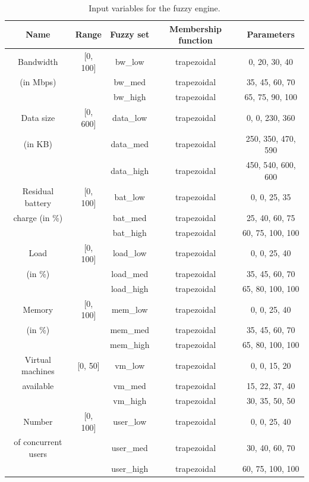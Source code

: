 \begin{table}[H]
	\centering
	\begin{tabular}{|c|c|c|c|c|}
		\hline
		Name                & Range    & Fuzzy set & Membership function & Parameters         \\
		\hline
		Bandwidth           & [0, 100] & bw_low    & trapezoidal         & 0, 20, 30, 40      \\
		(in Mbps)           &          & bw_med    & trapezoidal         & 35, 45, 60, 70     \\
		                    &          & bw_high   & trapezoidal         & 65, 75, 90, 100    \\
		\hline
		Data size           & [0, 600] & data_low  & trapezoidal         & 0, 0, 230, 360     \\
		(in KB)             &          & data_med  & trapezoidal         & 250, 350, 470, 590 \\
		                    &          & data_high & trapezoidal         & 450, 540, 600, 600 \\
		\hline
		Residual battery    & [0, 100] & bat_low   & trapezoidal         & 0, 0, 25, 35       \\
		charge (in \%)      &          & bat_med   & trapezoidal         & 25, 40, 60, 75     \\
		                    &          & bat_high  & trapezoidal         & 60, 75, 100, 100   \\
		\hline
		Load                & [0, 100] & load_low  & trapezoidal         & 0, 0, 25, 40       \\
		(in \%)             &          & load_med  & trapezoidal         & 35, 45, 60, 70     \\
		                    &          & load_high & trapezoidal         & 65, 80, 100, 100   \\
		\hline
		Memory              & [0, 100] & mem_low   & trapezoidal         & 0, 0, 25, 40       \\
		(in \%)             &          & mem_med   & trapezoidal         & 35, 45, 60, 70     \\
		                    &          & mem_high  & trapezoidal         & 65, 80, 100, 100   \\
		\hline
		Virtual machines    & [0, 50]  & vm_low    & trapezoidal         & 0, 0, 15, 20       \\
		available           &          & vm_med    & trapezoidal         & 15, 22, 37, 40     \\
		                    &          & vm_high   & trapezoidal         & 30, 35, 50, 50     \\
		\hline
		Number              & [0, 100] & user_low  & trapezoidal         & 0, 0, 25, 40       \\
		of concurrent users &          & user_med  & trapezoidal         & 30, 40, 60, 70     \\
		                    &          & user_high & trapezoidal         & 60, 75, 100, 100   \\
		\hline
	\end{tabular}
	\caption{Input variables for the fuzzy engine.}
	\label{tab:fuzzy-input}
\end{table}

